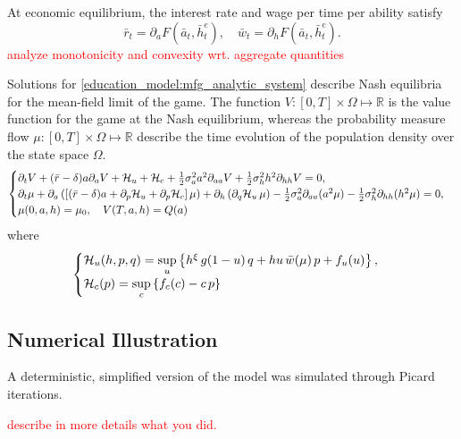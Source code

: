 At economic equilibrium, the interest rate and wage per time per ability satisfy
$$\bar r_t = \partial_a F(\bar a_t, \bar h^e_t),\quad \bar w_t = \partial_h F(\bar a_t, \bar h^e_t).$$
\textcolor{red}{analyze monotonicity and convexity wrt. aggregate quantities}


Solutions for \eqref{education_model:mfg_analytic_system} describe Nash equilibria for the mean-field limit of the game.
The function $V: [0,T] \times \Omega \mapsto \mathbb{R}$ is the value function for the game at the Nash equilibrium,
whereas the probability measure flow $\mu: [0,T] \times \Omega \mapsto \mathbb{R}$ describe the time evolution of the  population density over the state space $\Omega$.
\begin{equation}\label{education_model:mfg_analytic_system}
    \begin{cases}
        \partial_t V + (\bar r  - \delta) a \partial_a V + \mathcal{H}_u  + \mathcal{H}_c + \frac{1}{2} \sigma_a^2 a^2 \partial_{aa} V + \frac{1}{2} \sigma^2_h h^2 \partial_{hh} V = 0,\\
        \partial_t \mu + \partial_a \left( \left[ (\bar r - \delta) a + \partial_p \mathcal{H}_u + \partial_p \mathcal{H}_c \right] \mu \right)  + \partial_h \left( \partial_q \mathcal{H}_u\, \mu\right)  - \frac{1}{2} \sigma_a^2 \partial_{aa} (a^2\mu) - \frac{1}{2} \sigma^2_h \partial_{hh} (h^2\mu) = 0,\\
        \mu(0,a,h) = \mu_0,\quad V(T,a,h) = Q(a)
    \end{cases}
\end{equation}
where
\begin{equation}
    \begin{cases}
        \mathcal{H}_u(h,p,q) = \sup\limits_{u} \left \{ h^\xi \, g(1 - u)\, q + h u \, \bar w (\mu)\, p + f_u(u)\right\},\\
        \mathcal{H}_c(p) = \sup\limits_{c} \left \{  f_c(c) - c \, p \right \}
    \end{cases}
\end{equation}

\subsection{Numerical Illustration}
        A deterministic, simplified version of the model was simulated through Picard iterations.
        
        \textcolor{red}{describe in more details what you did.}
        
